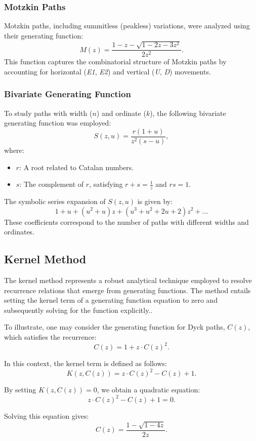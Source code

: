 \documentclass{article}
\begin{document}
\subsubsection{Motzkin Paths}
Motzkin paths, including summitless (peakless) variations, were analyzed using their generating function:
\[
M(z) = \frac{1 - z - \sqrt{1 - 2z - 3z^2}}{2z^2}.
\]
This function captures the combinatorial structure of Motzkin paths by accounting for horizontal (\textit{E1}, \textit{E2}) and vertical (\textit{U}, \textit{D}) movements.

\subsubsection{Bivariate Generating Function}
To study paths with width (\(n\)) and ordinate (\(k\)), the following bivariate generating function was employed:
\[
S(z, u) = \frac{r(1 + u)}{z^2(s - u)},
\]
where:
\begin{itemize}
    \item \(r\): A root related to Catalan numbers.
    \item \(s\): The complement of \(r\), satisfying \(r + s = \frac{1}{z}\) and \(rs = 1\).
\end{itemize}

The symbolic series expansion of \(S(z, u)\) is given by:
\[
1 + u + (u^2 + u)z + (u^3 + u^2 + 2u + 2)z^2 + \ldots
\]
These coefficients correspond to the number of paths with different widths and ordinates.

\subsection{Kernel Method}
The kernel method represents a robust analytical technique employed to resolve recurrence relations that emerge from generating functions. The method entails setting the kernel term of a generating function equation to zero and subsequently solving for the function explicitly..

To illustrate, one may consider the generating function for Dyck paths, $C(z)$, which satisfies the recurrence:
\[
C(z) = 1 + z \cdot C(z)^2.
\]

In this context, the kernel term is defined as follows:
\[
K(z, C(z)) = z \cdot C(z)^2 - C(z) + 1.
\]

By setting $K(z, C(z)) = 0$, we obtain a quadratic equation:
\[
z \cdot C(z)^2 - C(z) + 1 = 0.
\]

Solving this equation gives:
\[
C(z) = \frac{1 - \sqrt{1 - 4z}}{2z}.
\]
\end{document}
